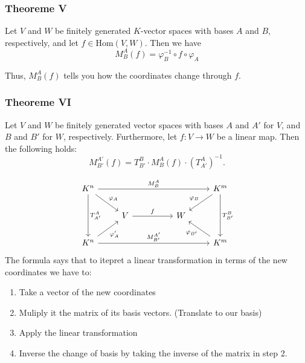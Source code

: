 \subsubsection*{Theoreme V}
 
Let \( V \) and \( W \) be finitely 
generated \( K \)-vector spaces with 
bases \( A \) and \( B \), respectively, and let \( f \in \mathrm{Hom}(V, W) \).
Then we have
\[
M_B^A(f) = \varphi_B^{-1} \circ f \circ \varphi_A
\]

Thus, \( M_B^A(f) \) tells you how the coordinates change through \( f \).

\subsubsection*{Theoreme VI} 

Let \( V \) and \( W \) be finitely generated vector spaces with bases \( A \) and \( A' \) for \( V \), and \( B \) and \( B' \) for \( W \), respectively.  
Furthermore, let \( f: V \to W \) be a linear map. Then the following holds:
\[
M_{B'}^{A'}(f) = T_{B'}^{B} \cdot M_{B}^{A}(f) \cdot \left( T_{A'}^{A} \right)^{-1}.
\]

\[
    \begin{tikzcd}
        K^n \arrow[dd, "T_{A'}^{A}"] \arrow[rrrr, "M_{B}^{A}"] \arrow[rd, "\varphi_A"] &                   &  &   & K^m \arrow[dd, "T_{B'}^{B}"] \arrow[ld, "\varphi_B"'] \\
                                                                                       & V \arrow[rr, "f"] &  & W &                                                       \\
        K^n \arrow[rrrr, "M_{B'}^{A'}"] \arrow[ru, "\varphi_{A}'"']                    &                   &  &   & K^m \arrow[lu, "\varphi_{B'}"]                       
    \end{tikzcd}
\]
The formula says that to itepret a linear transformation in terms of the
new coordinates we have to:
\begin{enumerate}
    \item Take a vector of the new coordinates
    \item Muliply it the matrix of its basis vectors. (Translate to our basis)
    \item Apply the linear transformation
    \item Inverse the change of basis by taking the inverse of the 
    matrix in step 2.
\end{enumerate}
